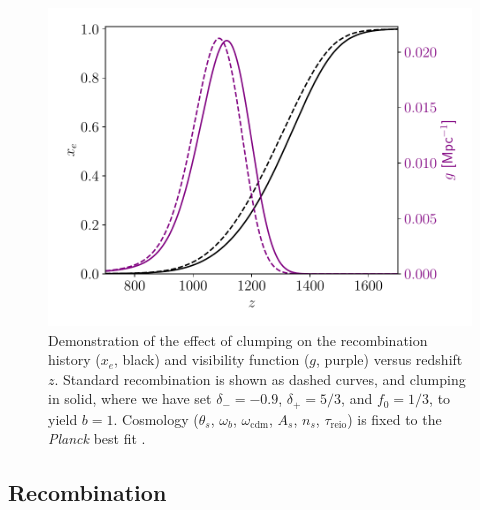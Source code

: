 \begin{figure}[ht!]
\includegraphics[width=\columnwidth]{img/M3demo-rec.pdf}
\caption[Demonstration of the effect of clumping on the recombination history and visibility function]{Demonstration of the effect of clumping on the recombination history ($x_e$, black) and visibility function ($g$, purple) versus redshift $z$.
Standard recombination is shown as dashed curves, and clumping in solid, where we have set $\delta_-=-0.9$, $\delta_+=5/3$, and $f_0=1/3$, to yield $b=1$.
Cosmology ($\theta_s$, $\omega_b$, $\omega_\mathrm{cdm}$, $A_s$, $n_s$, $\tau_\mathrm{reio}$) is fixed to the {\it Planck} best fit \citep{Planck2018-cosmo}.}
\label{fig:M3demo-rec}
\end{figure}

\subsection{Recombination}


